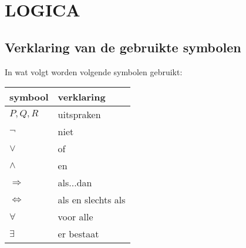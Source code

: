 \section{LOGICA} \label{logica}
\hypertarget{logica}{}

\subsection{Verklaring van de gebruikte symbolen} \label{verklaring_symbolen}
\hypertarget{verklaring_symbolen}{}
In wat volgt worden volgende symbolen gebruikt:\vskip 0.5cm
\begin{tabular}{l|l}
symbool & verklaring \\
\hline
$P, Q, R$ & uitspraken \\
$\neg$ & niet \\
$\vee$ & of \\
$\wedge$ & en \\
$\Rightarrow$ & als...dan \\
$\Leftrightarrow$ & als en slechts als \\
$\forall$ & voor alle\\
$\exists$ & er bestaat\\
\end{tabular}\vskip 0.5cm

